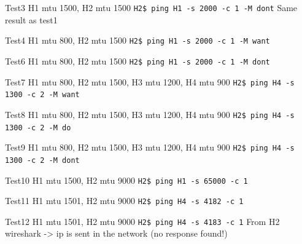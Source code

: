 \documentclass{exam}
\begin{document}
Test3
H1 mtu 1500, H2 mtu 1500
\verb|H2$ ping H1 -s 2000 -c 1 -M dont|
Same result as test1

Test4
H1 mtu 800, H2 mtu 1500
\verb|H2$ ping H1 -s 2000 -c 1 -M want|

Test6
H1 mtu 800, H2 mtu 1500
\verb|H2$ ping H1 -s 2000 -c 1 -M dont|

Test7
H1 mtu 800, H2 mtu 1500, H3 mtu 1200, H4 mtu 900
\verb|H2$ ping H4 -s 1300 -c 2 -M want|

Test8
H1 mtu 800, H2 mtu 1500, H3 mtu 1200, H4 mtu 900
\verb|H2$ ping H4 -s 1300 -c 2 -M do|

Test9
H1 mtu 800, H2 mtu 1500, H3 mtu 1200, H4 mtu 900
\verb|H2$ ping H4 -s 1300 -c 2 -M dont|

Test10
H1 mtu 1500, H2 mtu 9000
\verb|H2$ ping H1 -s 65000 -c 1|

Test11
H1 mtu 1501, H2 mtu 9000
\verb|H2$ ping H4 -s 4182 -c 1|

Test12
H1 mtu 1501, H2 mtu 9000
\verb|H2$ ping H4 -s 4183 -c 1|
From H2 wireshark -> ip is sent in the network (no response found!)
\end{document}
